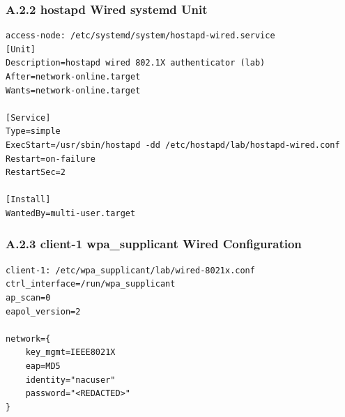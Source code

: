 \documentclass[11pt]{article}
\begin{document}

\subsubsection{A.2.2 hostapd Wired systemd Unit}
\label{sec:appendix-a-access-node-hostapd-wired-systemd-unit}

\begin{verbatim}
access-node: /etc/systemd/system/hostapd-wired.service
[Unit]
Description=hostapd wired 802.1X authenticator (lab)
After=network-online.target
Wants=network-online.target

[Service]
Type=simple
ExecStart=/usr/sbin/hostapd -dd /etc/hostapd/lab/hostapd-wired.conf
Restart=on-failure
RestartSec=2

[Install]
WantedBy=multi-user.target
\end{verbatim}


\subsubsection{A.2.3 client-1 wpa\_supplicant Wired Configuration}
\label{sec:appendix-a-client-1-wpa-supplicant-wired-8021x-config}

\begin{verbatim}
client-1: /etc/wpa_supplicant/lab/wired-8021x.conf
ctrl_interface=/run/wpa_supplicant
ap_scan=0
eapol_version=2

network={
    key_mgmt=IEEE8021X
    eap=MD5
    identity="nacuser"
    password="<REDACTED>"
}
\end{verbatim}

\end{document}
